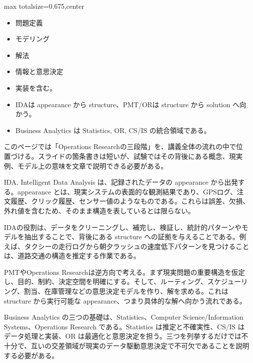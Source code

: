 \clearpage
{}
\begin{adjustbox}{max totalsize={\textwidth}{0.675\textheight},center}
\begin{minipage}{\textwidth}\scriptsize
\begin{minipage}[t]{0.485\textwidth}
\begin{itemize}
\item 問題定義
\item モデリング
\item 解法
\item 情報と意思決定
\item 実装を含む。
\end{itemize}
\begin{itemize}
\item IDAは appearance から structure、PMT/ORは structure から solution へ向かう。
\item Business Analytics は Statistics, OR, CS/IS の統合領域である。
\end{itemize}
\end{minipage}\hfill
\begin{minipage}[t]{0.485\textwidth}
このページでは「Operations Researchの三段階」を、講義全体の流れの中で位置づける。スライドの箇条書きは短いが、試験ではその背後にある概念、現実例、モデル上の意味を文章で説明できる必要がある。\par
IDA, Intelligent Data Analysis は、記録されたデータの appearance から出発する。appearance とは、現実システムの表面的な観測結果であり、GPSログ、注文履歴、クリック履歴、センサー値のようなものである。これらは誤差、欠損、外れ値を含むため、そのまま構造を表しているとは限らない。\par
IDAの役割は、データをクリーニングし、補完し、検証し、統計的パターンやモデルを抽出することで、背後にある structure への証拠を与えることである。例えば、タクシーの走行ログから朝夕ラッシュの速度低下パターンを見つけることは、道路交通の構造を推定する作業である。\par
PMTやOperations Researchは逆方向で考える。まず現実問題の重要構造を仮定し、目的、制約、決定空間を明確にする。そして、ルーティング、スケジューリング、割当、在庫管理などの意思決定モデルを作り、解を求める。これは structure から実行可能な appearance、つまり具体的な解へ向かう流れである。\par
Business Analytics の三つの基礎は、Statistics、Computer Science/Information Systems、Operations Research である。Statistics は推定と不確実性、CS/IS はデータ処理と実装、OR は最適化と意思決定を担う。三つを列挙するだけでは不十分で、互いの交差領域が現実のデータ駆動意思決定で不可欠であることを説明する必要がある。\par

\end{minipage}
\end{minipage}
\end{adjustbox}
